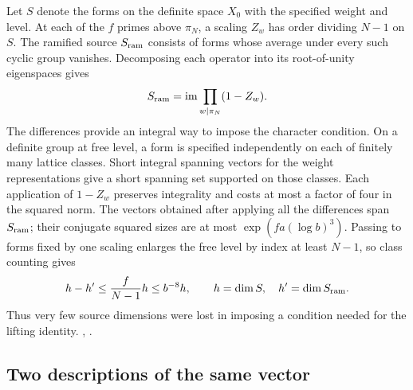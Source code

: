 Let \(S\) denote the forms on the definite space \(X_0\) with the specified weight and level. At each of the \(f\) primes above \(\pi_N\), a scaling \(Z_w\) has order dividing \(N-1\) on \(S\). The ramified source \(S_{\rm ram}\) consists of forms whose average under every such cyclic group vanishes. Decomposing each operator into its root-of-unity eigenspaces gives
\[
             S_{\rm ram}=\operatorname{im}\prod_{w\mid\pi_N}(1-Z_w).
\]
The differences provide an integral way to impose the character condition. On a definite group at free level, a form is specified independently on each of finitely many lattice classes. Short integral spanning vectors for the weight representations give a short spanning set supported on those classes. Each application of \(1-Z_w\) preserves integrality and costs at most a factor of four in the squared norm. The vectors obtained after applying all the differences span \(S_{\rm ram}\); their conjugate squared sizes are at most \(\exp(fa(\log b)^3)\). Passing to forms fixed by one scaling enlarges the free level by index at least \(N-1\), so class counting gives
\[
     h-h'\le \frac{f}{N-1}h\le b^{-8}h,
     \qquad h=\dim S,\quad h'=\dim S_{\rm ram}.
\]
Thus very few source dimensions were lost in imposing a condition needed for the lifting identity. , .

\subsection{Two descriptions of the same vector}

